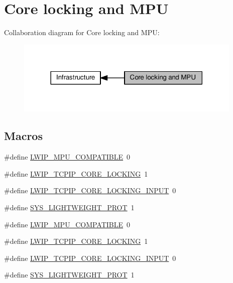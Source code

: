 \hypertarget{group__lwip__opts__lock}{}\section{Core locking and M\+PU}
\label{group__lwip__opts__lock}
Collaboration diagram for Core locking and M\+PU\+:
\nopagebreak
\begin{figure}[H]
\begin{center}
\leavevmode
\includegraphics[width=306pt]{group__lwip__opts__lock}
\end{center}
\end{figure}
\subsection*{Macros}
\begin{DoxyCompactItemize}
\item 
\#define \hyperlink{group__lwip__opts__lock_gae9afcefa5d233372abb9413188dd98c9}{L\+W\+I\+P\+\_\+\+M\+P\+U\+\_\+\+C\+O\+M\+P\+A\+T\+I\+B\+LE}~0
\item 
\#define \hyperlink{group__lwip__opts__lock_ga8e46232794349c209e8ed4e9e7e4f011}{L\+W\+I\+P\+\_\+\+T\+C\+P\+I\+P\+\_\+\+C\+O\+R\+E\+\_\+\+L\+O\+C\+K\+I\+NG}~1
\item 
\#define \hyperlink{group__lwip__opts__lock_ga351beb1c06affe49e717bc9f76c66acf}{L\+W\+I\+P\+\_\+\+T\+C\+P\+I\+P\+\_\+\+C\+O\+R\+E\+\_\+\+L\+O\+C\+K\+I\+N\+G\+\_\+\+I\+N\+P\+UT}~0
\item 
\#define \hyperlink{group__lwip__opts__lock_gae85efb3a5fcf8585c94b3c2669978959}{S\+Y\+S\+\_\+\+L\+I\+G\+H\+T\+W\+E\+I\+G\+H\+T\+\_\+\+P\+R\+OT}~1
\item 
\#define \hyperlink{group__lwip__opts__lock_gae9afcefa5d233372abb9413188dd98c9}{L\+W\+I\+P\+\_\+\+M\+P\+U\+\_\+\+C\+O\+M\+P\+A\+T\+I\+B\+LE}~0
\item 
\#define \hyperlink{group__lwip__opts__lock_ga8e46232794349c209e8ed4e9e7e4f011}{L\+W\+I\+P\+\_\+\+T\+C\+P\+I\+P\+\_\+\+C\+O\+R\+E\+\_\+\+L\+O\+C\+K\+I\+NG}~1
\item 
\#define \hyperlink{group__lwip__opts__lock_ga351beb1c06affe49e717bc9f76c66acf}{L\+W\+I\+P\+\_\+\+T\+C\+P\+I\+P\+\_\+\+C\+O\+R\+E\+\_\+\+L\+O\+C\+K\+I\+N\+G\+\_\+\+I\+N\+P\+UT}~0
\item 
\#define \hyperlink{group__lwip__opts__lock_gae85efb3a5fcf8585c94b3c2669978959}{S\+Y\+S\+\_\+\+L\+I\+G\+H\+T\+W\+E\+I\+G\+H\+T\+\_\+\+P\+R\+OT}~1
\end{DoxyCompactItemize}


